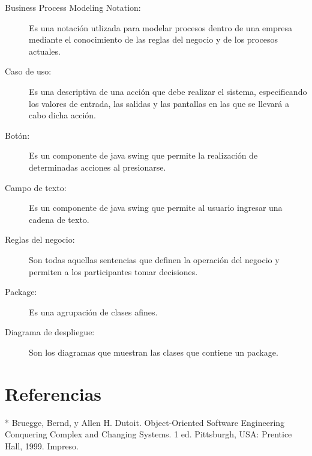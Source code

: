 \begin{description}
	\item[Business Process Modeling Notation:] Es una notación utlizada para modelar procesos dentro de una empresa mediante el conocimiento de las reglas del negocio y de los procesos actuales.
\end{description}

\begin{description}
	\item[Caso de uso:] Es una descriptiva de una acción que debe realizar el sistema, especificando los valores de entrada, las salidas y las pantallas en las que se llevará a cabo dicha acción.
\end{description}

\begin{description}
	\item[Botón:] Es un componente de java swing que permite la realización de determinadas acciones al presionarse.
\end{description}

\begin{description}
	\item[Campo de texto:] Es un componente de java swing que permite al usuario ingresar una cadena de texto.
\end{description}

\begin{description}
	\item[Reglas del negocio:] Son todas aquellas sentencias que definen la operación del negocio y permiten a los participantes tomar decisiones.
\end{description}

\begin{description}
	\item[Package:] Es una agrupación de clases afines.
\end{description}

\begin{description}
	\item[Diagrama de despliegue:] Son los diagramas que muestran las clases que contiene un package.
\end{description}

\section{Referencias}
* Bruegge, Bernd, y Allen H. Dutoit. Object-Oriented Software Engineering Conquering Complex and Changing Systems. 1 ed. Pittsburgh, USA: Prentice Hall, 1999. Impreso. \\

